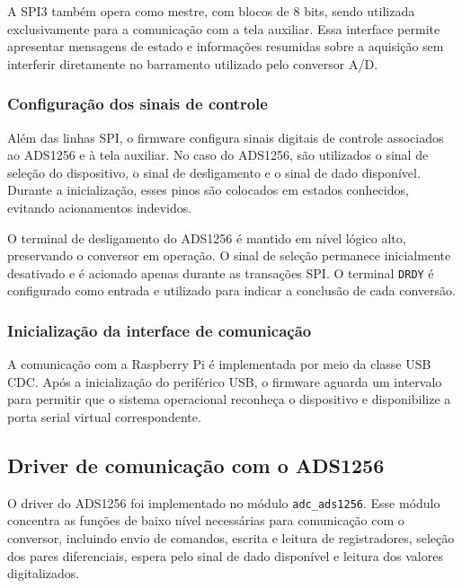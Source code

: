 \documentclass[a4paper,12pt]{fcte}
\begin{document}
A SPI3 também opera como mestre, com blocos de 8 bits, sendo utilizada exclusivamente para a comunicação com a tela auxiliar. Essa interface permite apresentar mensagens de estado e informações resumidas sobre a aquisição sem interferir diretamente no barramento utilizado pelo conversor A/D.

\subsubsection{Configuração dos sinais de controle}

Além das linhas SPI, o firmware configura sinais digitais de controle associados ao ADS1256 e à tela auxiliar. No caso do ADS1256, são utilizados o sinal de seleção do dispositivo, o sinal de desligamento e o sinal de dado disponível. Durante a inicialização, esses pinos são colocados em estados conhecidos, evitando acionamentos indevidos.

O terminal de desligamento do ADS1256 é mantido em nível lógico alto, preservando o conversor em operação. O sinal de seleção permanece inicialmente desativado e é acionado apenas durante as transações SPI. O terminal \texttt{DRDY} é configurado como entrada e utilizado para indicar a conclusão de cada conversão.

\subsubsection{Inicialização da interface de comunicação}

A comunicação com a Raspberry Pi é implementada por meio da classe USB CDC. Após a inicialização do periférico USB, o firmware aguarda um intervalo para permitir que o sistema operacional reconheça o dispositivo e disponibilize a porta serial virtual correspondente.


\subsection{Driver de comunicação com o ADS1256}
\label{subsec:driver_ads1256}

O driver do ADS1256 foi implementado no módulo \texttt{adc\_ads1256}. Esse módulo concentra as funções de baixo nível necessárias para comunicação com o conversor, incluindo envio de comandos, escrita e leitura de registradores, seleção dos pares diferenciais, espera pelo sinal de dado disponível e leitura dos valores digitalizados.
\end{document}

